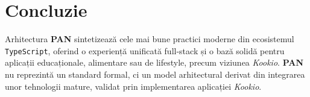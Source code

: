 \section{Concluzie}
Arhitectura \textbf{PAN} sintetizează cele mai bune practici moderne din ecosistemul \texttt{TypeScript}, oferind o experiență unificată full-stack și o bază solidă pentru aplicații educaționale, alimentare sau de lifestyle, precum viziunea \textit{Kookio}.
\textbf{PAN} nu reprezintă un standard formal, ci un model arhitectural derivat din integrarea unor tehnologii mature, validat prin implementarea aplicației \textit{Kookio}.
